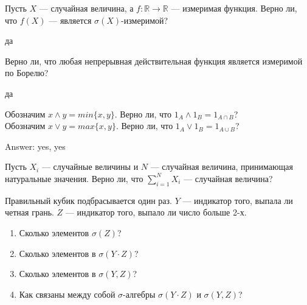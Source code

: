 \begin{problem}
Пусть $X$ — случайная величина, а $f:\mathbb{R}\rightarrow
\mathbb{R}$ — измеримая функция.
Верно ли, что $f(X)$ — является $\sigma(X)$-измеримой?

\begin{sol}
да
\end{sol}
\end{problem}

\begin{problem}
Верно ли, что любая непрерывная действительная функция является
измеримой по Борелю?

\begin{sol}
да
\end{sol}
\end{problem}

\begin{problem}
Обозначим $x \wedge y = min\{x,y\}$. Верно ли, что $1_{A} \wedge
1_{B}=1_{A\cap B}$? \\
Обозначим $x \vee y = max\{x,y\}$. Верно ли, что $1_{A} \vee
1_{B}=1_{A\cup B}$?

\begin{sol}

Answer: yes, yes
\end{sol}
\end{problem}

\begin{problem}
Пусть $X_{i}$ — случайные величины и $N$ — случайная величина,
принимающая натуральные значения. Верно ли, что
$\sum_{i=1}^{N}X_{i}$ — случайная величина?

\begin{sol}

\end{sol}
\end{problem}

\begin{problem}
 Правильный кубик подбрасывается один раз. $Y$ — индикатор того, выпала ли четная грань. $Z$ — индикатор того, выпало ли число больше 2-х. \\
\begin{enumerate}
\item Сколько элементов $\sigma(Z)$?
\item Сколько элементов в $\sigma(Y\cdot Z)$?
\item Сколько элементов в $\sigma(Y,Z)$?
\item Как связаны между собой $ \sigma $-алгебры $\sigma(Y\cdot Z)$ и $\sigma(Y,Z)$?
\end{enumerate}


\begin{sol}

\end{sol}
\end{problem}

